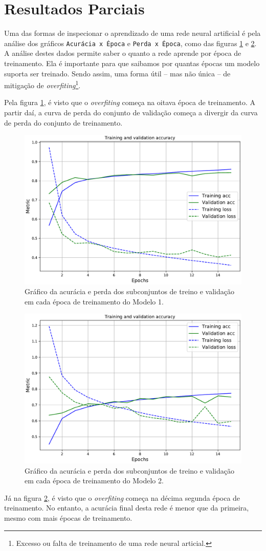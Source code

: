 \section*{Resultados Parciais}
Uma das formas de inspecionar o aprendizado de uma rede neural artificial é pela análise dos gráficos \texttt{Acurácia x Época} e \texttt{Perda x Época}, como das figuras \ref{fig:conv_train} e \ref{fig:pretrained_train}. A análise destes dados permite saber o quanto a rede aprende por época de treinamento. Ela é importante para que saibamos por quantas épocas um modelo suporta ser treinado. Sendo assim, uma forma útil -- mas não única -- de mitigação de \emph{overfiting}\footnote{Excesso ou falta de treinamento de uma rede neural articial.}.

Pela figura \ref{fig:conv_train}, é visto que o \emph{overfiting} começa na oitava época de treinamento. A partir daí, a curva de perda do conjunto de validação começa a divergir da curva de perda do conjunto de treinamento.

\pagebreak
\begin{figure}[h!]
  \centering
  \includegraphics[width=.79\textwidth]{figures/conv_train.pdf}
  \caption{Gráfico da acurácia e perda dos subconjuntos de treino e validação em cada época de treinamento do Modelo 1.}
  \label{fig:conv_train}
\end{figure}

\begin{figure}[h!]
  \centering
  \includegraphics[width=.79\textwidth]{figures/pretrained_train.pdf}
  \caption{Gráfico da acurácia e perda dos subconjuntos de treino e validação em cada época de treinamento do Modelo 2.}
  \label{fig:pretrained_train}
\end{figure}
\pagebreak

Já na figura \ref{fig:pretrained_train}, é visto que o \emph{overfiting} começa na décima segunda época de treinamento. No entanto, a acurácia final desta rede é menor que da primeira, mesmo com mais épocas de treinamento.